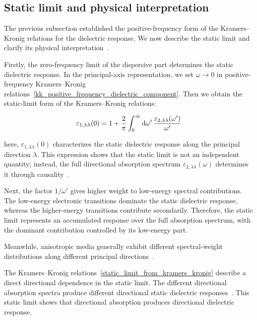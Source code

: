 \subsection{Static limit and physical interpretation}

The previous subsection established the positive-frequency form of the Kramers--Kronig relations for the dielectric response.
We now describe the static limit and clarify its physical interpretation~\cite{onishi2024universal,vandenberghe2023two}.

Firstly, the zero-frequency limit of the dispersive part determines the static dielectric response.
In the principal-axis representation,
we set $\omega\to0$ in positive-frequency Kramers--Kronig relations~\eqref{kk_positive_frequency_dielectric_component}.
Then we obtain the static-limit form of the Kramers--Kronig relations:

\begin{equation}
    \varepsilon_{1,\lambda\lambda}(0)
    = 1+\frac{2}{\pi}
    \int_{0}^{\infty}\mathrm{d}{\omega'}\,
    \frac{\varepsilon_{2,\lambda\lambda}(\omega')}{\omega'}
\label{static_limit_from_kramers_kronig}
\end{equation}

here, $\varepsilon_{1,\lambda\lambda}(0)$ characterizes the static dielectric response along the principal direction $\lambda$.
This expression shows that the static limit is not an independent quantity;
instead, the full directional absorption spectrum $\varepsilon_{2,\lambda\lambda}(\omega)$ determines it through causality~\cite{osanloo2021identification}.

Next, the factor $1/\omega'$ gives higher weight to low-energy spectral contributions.
The low-energy electronic transitions dominate the static dielectric response,
whereas the higher-energy transitions contribute secondarily.
Therefore, the static limit represents an accumulated response over the full absorption spectrum,
with the dominant contribution controlled by its low-energy part.

Meanwhile, anisotropic media generally exhibit different spectral-weight distributions along different principal directions~\cite{suk2024ultrafast,sun2025recent}.

The Kramers--Kronig relations~\eqref{static_limit_from_kramers_kronig} describe a direct directional dependence in the static limit.
The different directional absorption spectra produce different directional static dielectric responses~\cite{suk2024ultrafast}.
This static limit shows that directional absorption produces directional dielectric response.

